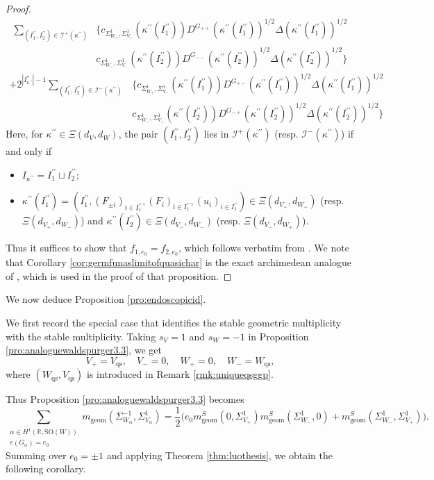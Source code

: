 \documentclass[12pt]{amsart}
\numberwithin{equation}{subsection}
\newcommand{\BR}{{\mathbb {R}}}
\newcommand{\CI}{{\mathcal {I}}}
\newcommand{\SO}{{\mathrm{SO}}}
\def\alp{{\alpha}}
\def\Del{{\Delta}}
\def\Sig{{\Sigma}}
\def\p{\prime}
\def\geom{\mathrm{geom}}
\def\qs{\mathrm{qs}}
\def\SO{\mathrm{SO}}
\begin{document}
\begin{proof}
\begin{align*}
\sum_{
(I^{\p\p}_1,I^{\p\p}_2)\in \CI^+(\kappa^{\p\p})
}
&\big\{c_{\Sig_{W_+}^1,\Sig^1_{V_+}}
(\kappa^{\p\p}(I^{\p\p}_1))
D^{G_{++}}(\kappa^{\p\p}(I_1^{\p\p}))^{1/2}
\Del(\kappa^{\p\p}(I_1^{\p\p}))^{1/2}
\\
&c_{\Sig_{W_-}^1,\Sig^1_{V_-}}
(\kappa^{\p\p}(I^{\p\p}_2))
D^{G_{--}}(\kappa^{\p\p}(I_2^{\p\p}))^{1/2}
\Del(\kappa^{\p\p}(I_2^{\p\p}))^{1/2}
\big\}
\end{align*}
\begin{align*}
+2^{|I^*_{\kappa^{\p\p}}|-1}
\sum_{
(I^{\p\p}_1,I^{\p\p}_2)\in \CI^-(\kappa^{\p\p})
}
&\big\{c_{\Sig_{W_+}^1,\Sig^1_{V_-}}
(\kappa^{\p\p}(I^{\p\p}_1))
D^{G_{+-}}(\kappa^{\p\p}(I_1^{\p\p}))^{1/2}
\Del(\kappa^{\p\p}(I_1^{\p\p}))^{1/2}
\\
&c_{\Sig_{W_-}^1,\Sig^1_{V_+}}
(\kappa^{\p\p}(I^{\p\p}_2))
D^{G_{-+}}(\kappa^{\p\p}(I_2^{\p\p}))^{1/2}
\Del(\kappa^{\p\p}(I_2^{\p\p}))^{1/2}
\big\}
\end{align*}
Here, for $\kappa^{\p\p}\in \Xi(d_V,d_W)$, the pair $(I^{\p\p}_1,I^{\p\p}_2)$ lies in $\CI^+(\kappa^{\p\p})$ (resp. $\CI^-(\kappa^{\p\p})$) if and only if
\begin{itemize}
    \item
$I_{\kappa^{\p\p}} = I^{\p\p}_1\sqcup I^{\p\p}_2$;

    \item
$\kappa^{\p\p}(I^{\p\p}_1) =(I^{\p\p}_1,(F_{\pm i})_{i\in I^{\p\p}_1}, (F_i)_{i\in I^{\p\p}_1}, (u_i)_{i\in I^{\p\p}_1})\in \Xi(d_{V_+},d_{W_+})$ (resp. $\Xi(d_{V_+},d_{W_-})$) and $\kappa^{\p\p}(I_2^{\p\p})\in \Xi(d_{V_-},d_{W_-})$ (resp. $\Xi(d_{V_-},d_{W_+})$).
\end{itemize}
Thus it suffices to show that $f_{1,e_0}=f_{2,e_0}$, which follows verbatim
from \cite[Prop.~3.3]{MR3155345}. We note that Corollary
\ref{cor:germfunaslimitofquasichar} is the exact archimedean analogue of
\cite[3.1~(3)]{MR3155345}, which is used in the proof of that proposition.
\end{proof}

We now deduce Proposition \ref{pro:endoscopicid}.

We first record the special case that identifies the stable geometric
multiplicity with the stable multiplicity. Taking $s_V=1$ and $s_W=-1$ in
Proposition \ref{pro:analoguewaldspurger3.3}, we get
\[
V_+ = V_\qs, \quad V_- = 0, \quad W_+ = 0,\quad W_-=W_\qs,
\]
where $(W_\qs,V_\qs)$ is introduced in Remark \ref{rmk:uniqueqsggp}.

Thus Proposition \ref{pro:analoguewaldspurger3.3} becomes
\[
\sum_{
\substack{
\alp\in H^1(\BR,\SO(W))
\\
e(G_\alp) = e_0}
}
m_\geom(\Sig^{-1}_{W_\alp},\Sig^1_{V_\alp}) =
\frac{1}{2}
\big(
e_0
m^S_\geom(0,\Sig^1_{V_+})
m^S_\geom(\Sig^1_{W_-},0)
+m^S_\geom(\Sig^1_{W_-},\Sig^1_{V_+})
\big).
\]
Summing over $e_0=\pm 1$ and applying Theorem \ref{thm:luothesis}, we obtain
the following corollary.
\end{document}
